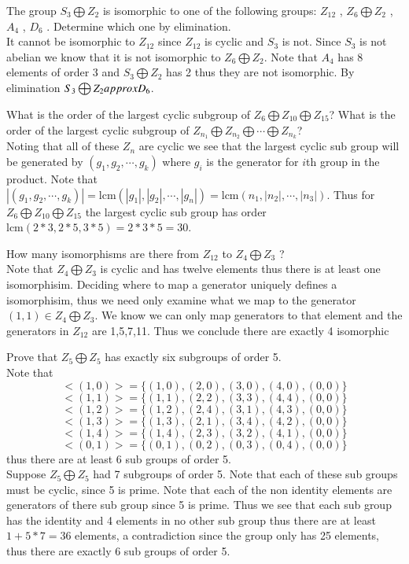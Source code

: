 \documentclass[12pt]{article}
\makeatletter
\theoremstyle{homework}
\newenvironment{exercise}[1]
{\def\@currentlabel{#1}\exercisecore}
{\endexercisecore}
\makeatother
\begin{document}
\begin{exercise}{8.26}
The group $S_3 \bigoplus Z_2$ is isomorphic to one of the following groups:  $Z_{12}$ , $Z_6 \bigoplus Z_2$ , $A_4$ , $D_6$ . Determine which one by elimination.\\
It cannot be isomorphic to $Z_{12}$ since $Z_{12}$ is cyclic and $S_3$ is not.  Since $S_3$ is not abelian we know that it is not isomorphic to $Z_6 \bigoplus Z_2$.  Note that $A_4$ has 8 elements of order 3 and $S_3 \bigoplus Z_2$ has 2 thus they are not isomorphic.  By elimination $S_3 \bigoplus Z_2\\approx D_6$.
\end{exercise}

\begin{exercise}{8.32}
What is the order of the largest cyclic subgroup of $Z_6 \bigoplus Z_{10} \bigoplus Z_{15}$?  What is the order of the largest cyclic subgroup of $Z_{n_1} \bigoplus Z_{n_2} \bigoplus \cdots \bigoplus Z_{n_k}$?\\
Noting that all of these $Z_n$ are cyclic we see that the largest cyclic sub group will be generated by $(g_1,g_2,\cdots,g_k)$ where $g_i$ is the generator for $i$th group in the product.  Note that $|(g_1,g_2,\cdots,g_k)|=\text{lcm}(|g_1 |, |g_2 |, \cdots , |g_n |)=\text{lcm}(n_1, |n_2 |, \cdots , |n_3 |)$.  Thus for $Z_6 \bigoplus Z_{10} \bigoplus Z_{15}$ the largest cyclic sub group has order $\text{lcm}(2*3,2*5,3*5)=2*3*5=30$.
\end{exercise}

\begin{exercise}{8.55}
How many isomorphisms are there from $Z_{12}$ to $Z_4 \bigoplus Z_3$ ?\\
Note that $Z_4 \bigoplus Z_3$ is cyclic and has twelve elements thus there is at least one isomorphisim.
Deciding where to map a generator uniquely defines a isomorphisim, thus we need only examine what we map to the generator $(1,1)\in Z_4\bigoplus Z_3$.  We know we can only map generators to that element and the generators in $Z_{12}$ are 1,5,7,11.  Thus we conclude there are exactly 4 isomorphic
\end{exercise}

\begin{exercise}{8.58}
Prove that $Z_5 \bigoplus Z_5$ has exactly six subgroups of order 5.\\
Note that
$$<(1,0)>=\{(1,0),(2,0),(3,0),(4,0),(0,0)\}$$
$$<(1,1)>=\{(1,1),(2,2),(3,3),(4,4),(0,0)\}$$
$$<(1,2)>=\{(1,2),(2,4),(3,1),(4,3),(0,0)\}$$
$$<(1,3)>=\{(1,3),(2,1),(3,4),(4,2),(0,0)\}$$
$$<(1,4)>=\{(1,4),(2,3),(3,2),(4,1),(0,0)\}$$
$$<(0,1)>=\{(0,1),(0,2),(0,3),(0,4),(0,0)\}$$
thus there are at least 6 sub groups of order 5.\\
Suppose $Z_5 \bigoplus Z_5$ had 7 subgroups of order 5.  Note that each of these sub groups must be cyclic, since 5 is prime.  Note that each of the non identity elements are generators of there sub group since 5 is prime.  Thus we see that each sub group has the identity and 4 elements in no other sub group thus there are at least $1+5*7=36$ elements, a contradiction since the group only has 25 elements, thus there are exactly 6 sub groups of order 5.
\end{exercise}
\end{document}
